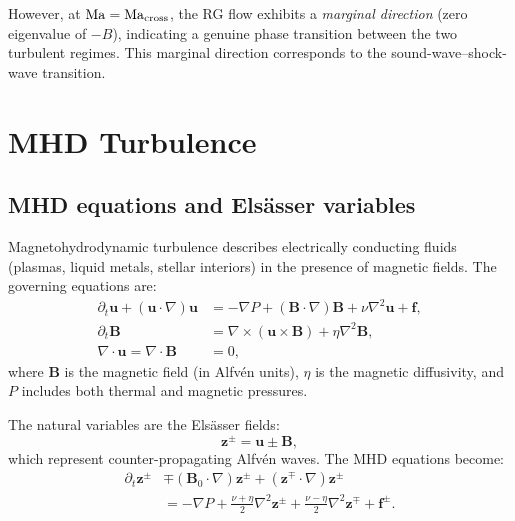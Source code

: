 However, at $\mathrm{Ma} = \mathrm{Ma}_{\mathrm{cross}}$, the RG flow exhibits a \emph{marginal direction} (zero eigenvalue of $-B$), indicating a genuine phase transition between the two turbulent regimes. This marginal direction corresponds to the sound-wave--shock-wave transition.

\section{MHD Turbulence\label{sec:mhd}}

\subsection{MHD equations and Els\"asser variables}

Magnetohydrodynamic turbulence describes electrically conducting fluids (plasmas, liquid metals, stellar interiors) in the presence of magnetic fields. The governing equations are:
{\footnotesize
\begin{align}
 \partial_t\mathbf{u} + (\mathbf{u}\cdot\nabla)\mathbf{u} &= -\nabla P + (\mathbf{B}\cdot\nabla)\mathbf{B} + \nu\nabla^2\mathbf{u} + \mathbf{f}, \\
\partial_t\mathbf{B} &= \nabla\times(\mathbf{u}\times\mathbf{B}) + \eta\nabla^2\mathbf{B}, \\
\nabla\cdot\mathbf{u} = \nabla\cdot\mathbf{B} &= 0,
\end{align}
}
where $\mathbf{B}$ is the magnetic field (in Alfv\'en units), $\eta$ is the magnetic diffusivity, and $P$ includes both thermal and magnetic pressures.

The natural variables are the Els\"asser fields:
\begin{equation}
\mathbf{z}^{\pm} = \mathbf{u} \pm \mathbf{B},
\end{equation}
which represent counter-propagating Alfv\'en waves. The MHD equations become:
{\scriptsize
\begin{equation}
\begin{aligned}
 \partial_t \mathbf{z}^{\pm} &\mp (\mathbf{B}_0\cdot\nabla)\mathbf{z}^{\pm} + (\mathbf{z}^{\mp}\cdot\nabla)\mathbf{z}^{\pm} \\
 &= -\nabla P + \tfrac{\nu+\eta}{2}\nabla^2\mathbf{z}^{\pm} + \tfrac{\nu-\eta}{2}\nabla^2\mathbf{z}^{\mp} + \mathbf{f}^{\pm}.
\end{aligned}
\end{equation}
}

